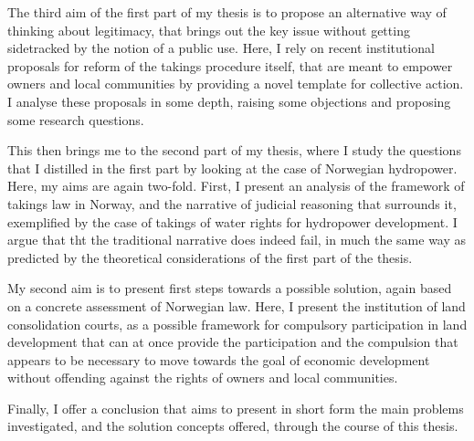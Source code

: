 The third aim of the first part of my thesis is to propose an alternative way of thinking about legitimacy, that brings out the key issue without getting sidetracked by the notion of a public use. Here, I rely on recent institutional proposals for reform of the takings procedure itself, that are meant to empower owners and local communities by providing a novel template for collective action. I analyse these proposals in some depth, raising some objections and proposing some research questions.

This then brings me to the second part of my thesis, where I study the questions that I distilled in the first part by looking at the case of Norwegian hydropower. Here, my aims are again two-fold. First, I present an analysis of the framework of takings law in Norway, and the narrative of judicial reasoning that surrounds it, exemplified by the case of takings of water rights for hydropower development. I argue that tht the traditional narrative does indeed fail, in much the same way as predicted by the theoretical considerations of the first part of the thesis. 

My second aim is to present first steps towards a possible solution, again based on a concrete assessment of Norwegian law. Here, I present the institution of land consolidation courts, as a possible framework for compulsory participation in land development that can at once provide the participation and the compulsion that appears to be necessary to move towards the goal of economic development without offending against the rights of owners and local communities.

Finally, I offer a conclusion that aims to present in short form the main problems investigated, and the solution concepts offered, through the course of this thesis.

